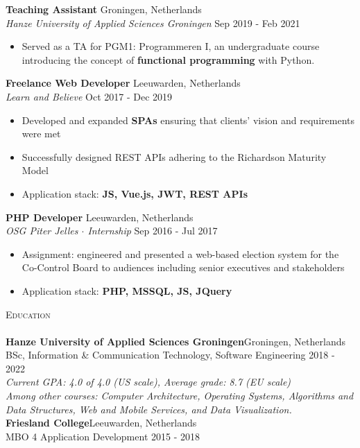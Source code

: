 \documentclass[a4paper]{article}
\newcommand{\lineunder} {
    \vspace*{-8pt} \\
    \hspace*{-18pt} \hrulefill \\
}
\newcommand{\header} [1] {
    {\hspace*{-18pt}\vspace*{6pt} \textsc{#1}}
    \vspace*{-6pt} \lineunder
}
\begin{document}
\textbf{Teaching Assistant} \hfill Groningen, Netherlands\\
\textit{ Hanze University of Applied Sciences Groningen} \hfill Sep 2019 - Feb 2021\\
\vspace{-1mm}
\begin{itemize} \itemsep 1pt
	\item Served as a TA for PGM1: Programmeren I, an undergraduate course introducing the concept of \textbf{functional programming} with Python.
\end{itemize}
\textbf{Freelance Web Developer} \hfill Leeuwarden, Netherlands\\
\textit{Learn and Believe} \hfill Oct 2017 - Dec 2019\\
\vspace{-1mm}
\begin{itemize} \itemsep 1pt
	\item Developed and expanded \textbf{SPAs} ensuring that clients' vision and requirements were met
    \item Successfully designed REST APIs adhering to the Richardson Maturity Model
	\item Application stack: \textbf{JS, Vue.js, JWT, REST APIs}
\end{itemize}
\textbf{PHP Developer} \hfill Leeuwarden, Netherlands\\
\textit{OSG Piter Jelles $\cdot$ Internship} \hfill Sep 2016 - Jul 2017\\
\vspace{-1mm}
\begin{itemize} \itemsep 1pt
	\item Assignment: engineered and presented a web-based election system for the Co-Control Board to audiences including senior executives and stakeholders
	\item Application stack: \textbf{PHP, MSSQL, JS, JQuery}
\end{itemize}

\vspace{5mm}

\header{Education}
\vspace{2mm}
\textbf{Hanze University of Applied Sciences Groningen}\hfill Groningen, Netherlands\\
BSc, Information \& Communication Technology, Software Engineering \hfill 2018 - 2022\\
\vspace{1mm}
\emph{Current GPA: 4.0 of 4.0 (US scale), Average grade: 8.7 (EU scale)}\\
\vspace{1mm}
\emph{Among other courses: Computer Architecture, Operating Systems, Algorithms and Data Structures, Web and Mobile Services, and Data Visualization.}\\
\vspace{2mm}
\textbf{Friesland College}\hfill Leeuwarden, Netherlands\\
MBO 4 Application Development \hfill 2015 - 2018\\
\end{document}

